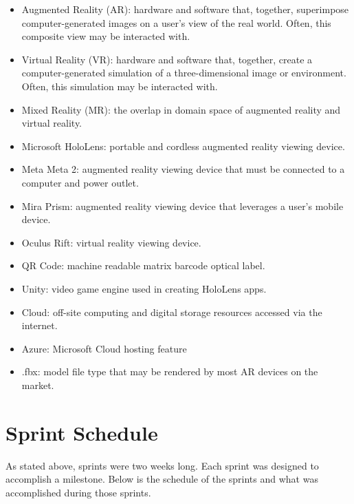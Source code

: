 \begin{itemize}
	\item Augmented Reality (AR): hardware and software that, together, superimpose computer-generated images on a user's view of the real world. Often, this composite view may be interacted with. 

	\item Virtual Reality (VR): hardware and software that, together, create a computer-generated simulation of a three-dimensional image or environment. Often, this simulation may be interacted with. 

	\item Mixed Reality (MR): the overlap in domain space of augmented reality and virtual reality. 

	\item Microsoft HoloLens: portable and cordless augmented reality viewing device. 

	\item Meta Meta 2: augmented reality viewing device that must be connected to a computer and power outlet. 

	\item Mira Prism: augmented reality viewing device that leverages a user's mobile device.

	\item Oculus Rift: virtual reality viewing device. 

    \item QR Code: machine readable matrix barcode optical label.
    
    \item Unity: video game engine used in creating HoloLens apps.

	\item Cloud: off-site computing and digital storage resources accessed via the internet. 

    \item Azure: Microsoft Cloud hosting feature

	\item .fbx: model file type that may be rendered by most AR devices on the market. 
\end{itemize}


\section{Sprint Schedule}
As stated above, sprints were two weeks long. Each sprint was designed to accomplish a milestone. 
Below is the schedule of the sprints and what was accomplished during those sprints.

